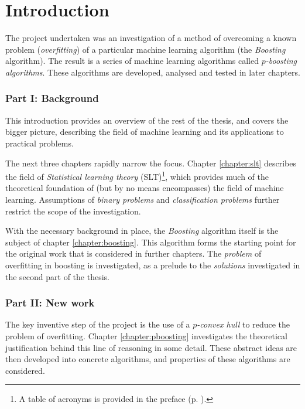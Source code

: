 
\chapter{Introduction}
\label{chapter:intro}

The project undertaken was an investigation of a method of
overcoming a known problem (\emph{overfitting}) of a particular
machine learning algorithm (the \emph{Boosting} algorithm).  The
result is a series of machine learning algorithms called
\emph{$p$-boosting algorithms}.  These algorithms are developed,
analysed and tested in later chapters.

\subsection*{Part I: Background}

This introduction provides an overview of the rest of the thesis, and
covers the bigger picture, describing the field of machine learning
and its applications to practical problems.

The next three chapters rapidly narrow the focus.  Chapter
\ref{chapter:slt} describes the field of \emph{Statistical learning
theory} (SLT)\footnote{A table of acronyms is provided in the
preface (p. \pageref{acronyms}).}, which provides much of the
theoretical foundation of (but by no means encompasses) the field of
machine learning.  Assumptions of \emph{binary problems} and
\emph{classification problems} further restrict the scope of the
investigation.

With the necessary background in place, the \emph{Boosting} algorithm
itself is the subject of chapter \ref{chapter:boosting}.  This
algorithm forms the starting point for the original work that is
considered in further chapters.  The \emph{problem} of overfitting in
boosting is investigated, as a prelude to the \emph{solutions}
investigated in the second part of the thesis. 


\subsection*{Part II: New work}

The key inventive step of the project is the use of a \emph{$p$-convex
hull} to reduce the problem of overfitting.  Chapter
\ref{chapter:pboosting} investigates the theoretical justification
behind this line of reasoning in some detail.  These abstract ideas
are then developed into concrete algorithms, and properties of these
algorithms are considered.

